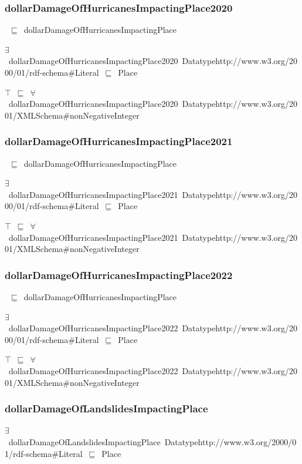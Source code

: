 \documentclass{article}
\begin{document}
\subsubsection*{dollarDamageOfHurricanesImpactingPlace2020}

~\ensuremath{\sqsubseteq}~dollarDamageOfHurricanesImpactingPlace

\ensuremath{\exists}~dollarDamageOfHurricanesImpactingPlace2020~Datatypehttp://www.w3.org/2000/01/rdf-schema#Literal~\ensuremath{\sqsubseteq}~Place

\ensuremath{\top}~\ensuremath{\sqsubseteq}~\ensuremath{\forall}~dollarDamageOfHurricanesImpactingPlace2020~Datatypehttp://www.w3.org/2001/XMLSchema#nonNegativeInteger

\subsubsection*{dollarDamageOfHurricanesImpactingPlace2021}

~\ensuremath{\sqsubseteq}~dollarDamageOfHurricanesImpactingPlace

\ensuremath{\exists}~dollarDamageOfHurricanesImpactingPlace2021~Datatypehttp://www.w3.org/2000/01/rdf-schema#Literal~\ensuremath{\sqsubseteq}~Place

\ensuremath{\top}~\ensuremath{\sqsubseteq}~\ensuremath{\forall}~dollarDamageOfHurricanesImpactingPlace2021~Datatypehttp://www.w3.org/2001/XMLSchema#nonNegativeInteger

\subsubsection*{dollarDamageOfHurricanesImpactingPlace2022}

~\ensuremath{\sqsubseteq}~dollarDamageOfHurricanesImpactingPlace

\ensuremath{\exists}~dollarDamageOfHurricanesImpactingPlace2022~Datatypehttp://www.w3.org/2000/01/rdf-schema#Literal~\ensuremath{\sqsubseteq}~Place

\ensuremath{\top}~\ensuremath{\sqsubseteq}~\ensuremath{\forall}~dollarDamageOfHurricanesImpactingPlace2022~Datatypehttp://www.w3.org/2001/XMLSchema#nonNegativeInteger

\subsubsection*{dollarDamageOfLandslidesImpactingPlace}

\ensuremath{\exists}~dollarDamageOfLandslidesImpactingPlace~Datatypehttp://www.w3.org/2000/01/rdf-schema#Literal~\ensuremath{\sqsubseteq}~Place
\end{document}

